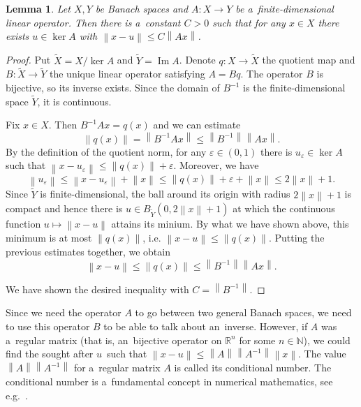 \documentclass[11pt,a4paper]{amsart}
\newtheorem{lemma}[theorem]{Lemma}
\theoremstyle{definition}
\newcommand{\R}{\mathbb{R}}
\newcommand{\N}{\mathbb{N}}
\newcommand{\eps}{\varepsilon}
\newcommand{\im}{\operatorname{Im}}
\newcommand{\norm}[1]{\left\| #1 \right\|}
\begin{document}
	\begin{lemma} \label{lma:LA_approxByKernel}
		Let $X, Y$ be Banach spaces and $A: X \to Y$ be a~finite-dimensional linear operator. Then there is a~constant $C > 0$ such that for any $x \in X$ there exists $u \in \ker A$ with $\norm{x-u} \leq C\norm{Ax}$.
	\end{lemma}
	\begin{proof}
		Put $\widetilde{X} = X / \ker A$ and $\widetilde{Y} = \im A$. Denote $q: X \to \widetilde{X}$ the quotient map and $B: \widetilde{X} \to \widetilde{Y}$ the unique linear operator satisfying $A = Bq$. The operator $B$ is bijective, so its inverse exists. Since the domain of $B^{-1}$ is the finite-dimensional space $\widetilde{Y}$, it is continuous.
		
		Fix $x \in X$. Then $B^{-1}Ax = q(x)$ and we can estimate
		\begin{equation*}
			\norm{q(x)} = \norm{B^{-1}Ax} \leq \norm{B^{-1}} \norm{Ax}.
		\end{equation*}
		By the definition of the quotient norm, for any $\eps \in (0, 1)$ there is $u_\eps \in \ker A$ such that $\norm{x - u_\eps} \leq \norm{q(x)} + \eps$. Moreover, we have
		\begin{equation*}
			\norm{u_\eps} \leq \norm{x - u_\eps} + \norm{x} \leq \norm{q(x)} + \eps + \norm{x} \leq 2\norm{x} + 1.
		\end{equation*}
		Since $\widetilde{Y}$ is finite-dimensional, the ball around its origin with radius $2\norm{x} + 1$ is compact and hence there is $u \in B_{\widetilde{Y}}(0, 2\norm{x} + 1)$ at which the continuous function $u \mapsto \norm{x-u}$ attains its minium. By what we have shown above, this minimum is at most $\norm{q(x)}$, i.e. $\norm{x - u} \leq \norm{q(x)}$. Putting the previous estimates together, we obtain
		\begin{equation*}
			\norm{x-u} \leq \norm{q(x)} \leq \norm{B^{-1}}\norm{Ax}.
		\end{equation*}
		
		We have shown the desired inequality with $C = \norm{B^{-1}}$.
	\end{proof}

	Since we need the operator $A$ to go between two general Banach spaces, we need to use this operator $B$ to be able to talk about an~inverse. However, if $A$ was a~regular matrix (that is, an~bijective operator on $\R^n$ for some $n \in \N$), we could find the sought after $u$~such that $\norm{x - u} \leq \norm{A}\norm{A^{-1}} \norm{x}$. The value $\norm{A}\norm{A^{-1}}$ for a~regular matrix $A$ is called its conditional number. The conditional number is a~fundamental concept in numerical mathematics, see e.g.~\cite[Section~3.1]{Quarteroni2007}.
	
\end{document}
